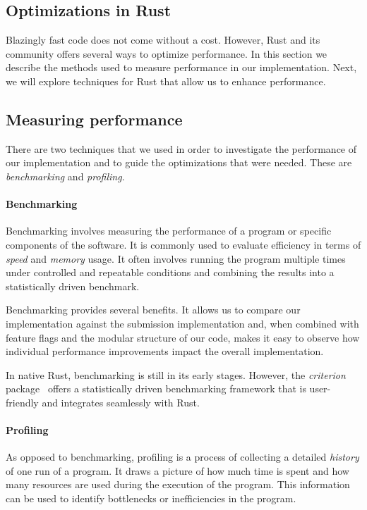 \documentclass[11pt]{report}
\theoremstyle{definition}
\theoremstyle{plain}
\begin{document}
\subsection{Optimizations in Rust}\label{sub:rust_optimizations}
Blazingly fast code does not come without a cost. However, Rust and its community offers several ways to optimize performance. In this section we describe the methods used to measure performance in our implementation. Next, we will explore techniques for Rust that allow us to enhance performance.

\subsection*{Measuring performance}\label{sec:rust_benchmarking}
There are two techniques that we used in order to investigate the performance of our implementation and  to guide the optimizations that were needed. These are \textit{benchmarking} and \textit{profiling}.

\paragraph{Benchmarking}
Benchmarking involves measuring the performance of a program or specific components of the software. It is commonly used to evaluate efficiency in terms of \textit{speed} and \textit{memory} usage. It often involves running the program multiple times under controlled and repeatable conditions and combining the results into a statistically driven benchmark.

Benchmarking provides several benefits. It allows us to compare our implementation against the submission implementation and, when combined with feature flags and the modular structure of our code, makes it easy to observe how individual performance improvements impact the overall implementation.

In native Rust, benchmarking is still in its early stages. However, the \textit{criterion} package~\cite{criterion} offers a statistically driven benchmarking framework that is user-friendly and integrates seamlessly with Rust.

\paragraph{Profiling}
As opposed to benchmarking, profiling is a process of collecting a detailed \textit{history} of one run of a program. It draws a picture of how much time is spent and how many resources are used during the execution of the program. This information can be used to identify bottlenecks or inefficiencies in the program.
\end{document}
